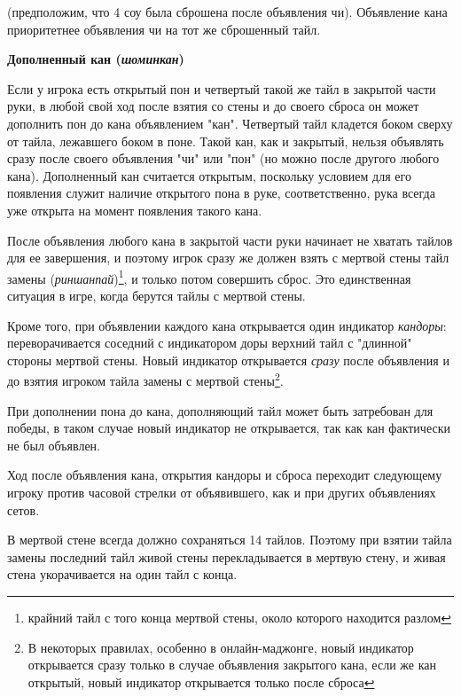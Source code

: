  \hfill {}

(предположим, что 4 соу была сброшена после объявления чи). Объявление кана приоритетнее объявления чи на тот же сброшенный тайл.

\textbf{Дополненный кан (\textit{шоминкан})}

Если у игрока есть открытый пон и четвертый такой же тайл в закрытой части руки, в любой свой ход после взятия со стены и до своего сброса он может дополнить пон до кана объявлением "кан". Четвертый тайл кладется боком сверху от тайла, лежавшего боком в поне. Такой кан, как и закрытый, нельзя объявлять сразу после своего объявления "чи" или "пон" (но можно после другого любого кана). Дополненный кан считается открытым, поскольку условием для его появления служит наличие открытого пона в руке, соответственно, рука всегда уже открыта на момент появления такого кана.


После объявления любого кана в закрытой части руки начинает не хватать тайлов для ее завершения, и поэтому игрок сразу же должен взять с мертвой стены тайл замены (\textit{риншанпай})\footnote{крайний тайл с того конца мертвой стены, около которого находится разлом}, и только потом совершить сброс. Это единственная ситуация в игре, когда берутся тайлы с мертвой стены. 

Кроме того, при объявлении каждого кана открывается один индикатор \textit{кандоры}: переворачивается соседний с индикатором доры верхний тайл с "длинной" стороны мертвой стены. Новый индикатор открывается \textit{сразу} после объявления и до взятия игроком тайла замены с мертвой стены\footnote{В некоторых правилах, особенно в онлайн-маджонге, новый индикатор открывается сразу только в случае объявления закрытого кана, если же кан открытый, новый индикатор открывается только после сброса}. 

При дополнении пона до кана, дополняющий тайл может быть затребован для победы, в таком случае новый индикатор не открывается, так как кан фактически не был объявлен.

Ход после объявления кана, открытия кандоры и сброса переходит следующему игроку против часовой стрелки от объявившего, как и при других объявлениях сетов. 

В мертвой стене всегда должно сохраняться 14 тайлов. Поэтому при взятии тайла замены последний тайл живой стены перекладывается в мертвую стену, и живая стена укорачивается на один тайл с конца.

